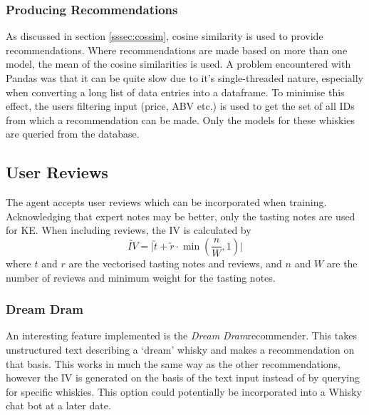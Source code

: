 \subsubsection{Producing Recommendations}
As discussed in section \ref{sssec:cossim}, cosine similarity is used to provide recommendations.
Where recommendations are made based on more than one model, the mean of the cosine similarities is used.
A problem encountered with Pandas was that it can be quite slow due to it's single-threaded nature, especially
when converting a long list of data entries into a dataframe. To minimise this effect, the users filtering input 
(price, ABV etc.) is used to get the set of all IDs from which a recommendation can be made.
Only the models for these whiskies are queried from the database.

\subsection{User Reviews}
The agent accepts user reviews which can be incorporated when training. Acknowledging that expert notes may be better,
only the tasting notes are used for KE. When including reviews, the IV is calculated by
\begin{equation}\label{eqn:revweight}
    \utilde{IV} = \vert \utilde{t} + \utilde{r} \cdot \min(\frac{n}{W}, 1) \vert 
\end{equation}
where $t$ and $r$ are the vectorised tasting notes and reviews, and $n$ and $W$ are the number of reviews and minimum weight 
for the tasting notes.

\subsubsection{Dream Dram}
An interesting feature implemented is the \emph{Dream Dram}recommender.  This takes unstructured text describing
a `dream' whisky and makes a recommendation on that basis. This works in much the same way as the other recommendations, 
however the IV is generated on the basis of the text input instead of by querying for specific whiskies. This option 
could potentially be incorporated into a Whisky chat bot at a later date.

